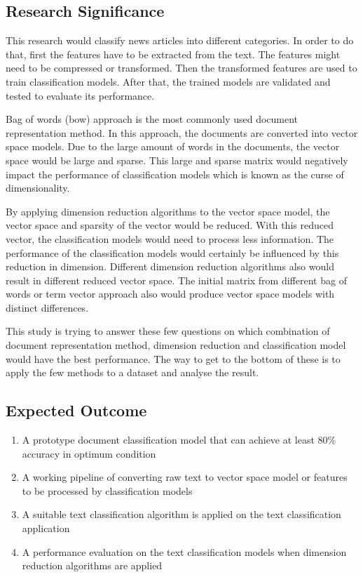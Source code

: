 \subsection{Research Significance}
This research would classify news articles into different categories. In order to do that, first the features have to be extracted from the text. The features might need to be compressed or transformed. Then the transformed features are used to train classification models. After that, the trained models are validated and tested to evaluate its performance.

Bag of words (\ac{bow}) approach is the most commonly used document representation method. In this approach, the documents are converted into vector space models. Due to the large amount of words in the documents, the vector space would be large and sparse. This large and sparse matrix would negatively impact the performance of classification models which is known as the curse of dimensionality.

By applying dimension reduction algorithms to the vector space model, the vector space and sparsity of the vector would be reduced. With this reduced vector, the classification models would need to process less information. The performance of the classification models would certainly be influenced by this reduction in dimension. Different dimension reduction algorithms also would result in different reduced vector space. The initial matrix from different bag of words or term vector approach also would produce vector space models with distinct differences.

This study is trying to answer these few questions on which combination of document representation method, dimension reduction and classification model would have the best performance. The way to get to the bottom of these is to apply the few methods to a dataset and analyse the result.\\


\subsection{Expected Outcome}
\begin{enumerate}
	\item A prototype document classification model that can achieve at least 80\% accuracy in optimum condition
	\item A working pipeline of converting raw text to vector space model or features to be processed by classification models
	\item A suitable text classification algorithm is applied on the text classification application
	\item A performance evaluation on the text classification models when dimension reduction algorithms are applied
\end{enumerate}

